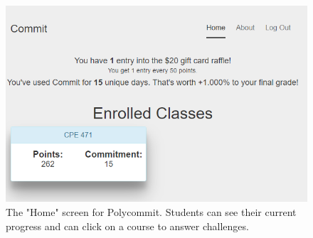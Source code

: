 \begin{figure}
	\includegraphics{figures/polycommit-screen}
	\caption{The "Home" screen for Polycommit. Students can see their current progress and can click on a course to answer challenges.}
	\label{fig:polycommit1}
\end{figure}